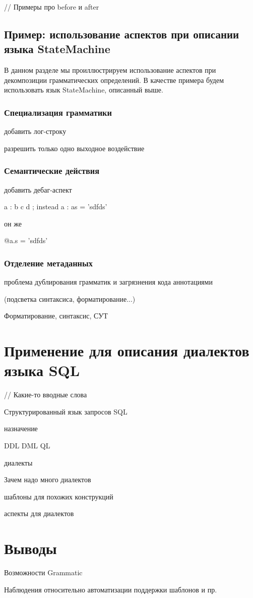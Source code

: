 // Примеры про before и after

\section{Пример: использование аспектов при описании языка StateMachine}

В данном разделе мы проиллюстрируем использование аспектов при декомпозиции грамматических определений. В качестве примера будем использовать язык StateMachine, описанный выше.

\subsection{Специализация грамматики}
добавить лог-строку

разрешить только одно выходное воздействие

\subsection{Семантические действия}

добавить дебаг-аспект

a : b c d ;
	instead a : a{s = 'sdfds'}
	
	он же 
	
	@a.s = 'sdfds'

\subsection{Отделение метаданных}


проблема дублирования грамматик и загрязнения кода аннотациями

(подсветка синтаксиса, форматирование...)

Форматирование, синтаксис, СУТ
	

\chapter{Применение  для описания диалектов языка SQL}

// Какие-то вводные слова

Структурированный язык запросов SQL

назначение

DDL DML QL

диалекты

Зачем надо много диалектов

шаблоны для похожих конструкций

аспекты для диалектов

\chapter{Выводы}

Возможности Grammatic

Наблюдения относительно автоматизации поддержки шаблонов и пр.

\newcommand{\dissonly}[1]{#1}
